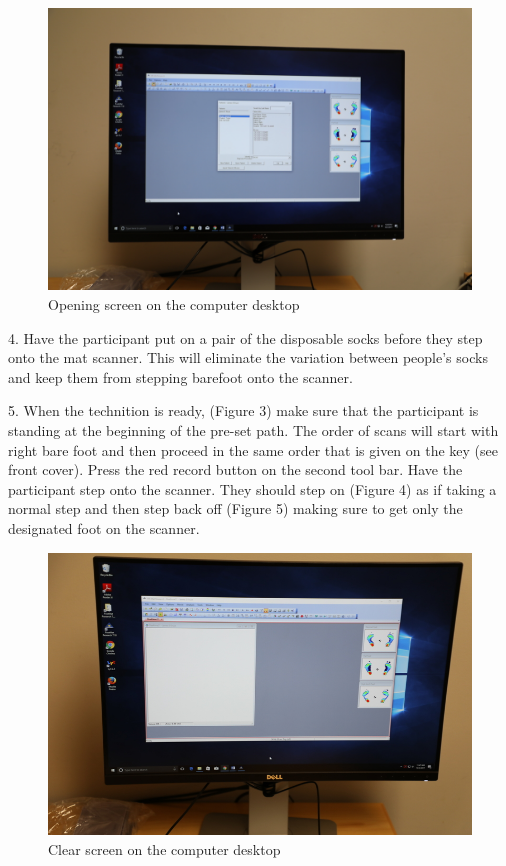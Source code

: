 \begin{figure}[!htp]
\centering
\includegraphics[scale=0.25]{Mat_Screen_1}
\caption{Opening screen on the computer desktop}
\label{Image 2}
\end{figure}

4. Have the participant put on a pair of the disposable socks before they step onto the mat scanner. This will eliminate the variation between people's socks and keep them from stepping barefoot onto the scanner. 

5. When the technition is ready, (Figure 3) make sure that the participant is standing at the beginning of the pre-set path. The order of scans will start with right bare foot and then proceed in the same order that is given on the key (see front cover). Press the red record button on the second tool bar. Have the participant step onto the scanner. They should step on (Figure 4) as if taking a normal step and then step back off (Figure 5) making sure to get only the designated foot on the scanner. 

\begin{figure}[!htp]
\centering
\includegraphics[scale=0.32]{Mat_Clear}
\caption{Clear screen on the computer desktop}
\label{Image 3}
\end{figure} 

